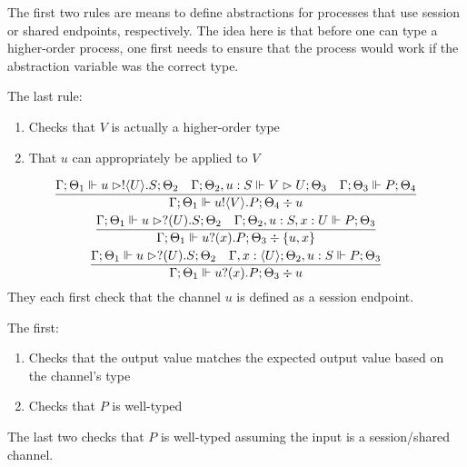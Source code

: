 The first two rules are means to define abstractions for processes that use session or shared endpoints, respectively. The idea here is that before one can type a higher-order process, one first needs to ensure that the process would work if the abstraction variable was the correct type.

The last rule:
\begin{enumerate}
    \item Checks that $V$ is actually a higher-order type
    \item That $u$ can appropriately be applied to $V$
\end{enumerate}

\begin{gather*}
\frac{\Gamma ; \Theta_1 \Vdash u \vartriangleright !\langle U \rangle . S ; \Theta_2 \quad \Gamma ; \Theta_2 , u : S \Vdash V \vartriangleright U ; \Theta_3 \quad \Gamma ; \Theta_3 \Vdash P ; \Theta_4}{\Gamma ; \Theta_1 \Vdash u ! \langle V \rangle . P ; \Theta_4 \div u} \\
\frac{\Gamma ;\Theta_1 \Vdash u \vartriangleright ?(U).S ; \Theta_2 \quad \Gamma ; \Theta_2 , u : S , x : U \Vdash P ; \Theta_3}{\Gamma ; \Theta_1 \Vdash u ? (x) . P ; \Theta_3 \div \{u,x\}} \\
\frac{\Gamma ; \Theta_1 \Vdash u \vartriangleright ?(U) . S ; \Theta_2 \quad \Gamma, x : \langle U \rangle ; \Theta_2 , u : S \Vdash P ; \Theta_3}{\Gamma ; \Theta_1 \Vdash u? (x) . P ; \Theta_3 \div u}
\end{gather*}
They each first check that the channel $u$ is defined as a session endpoint.

The first:
\begin{enumerate}
\item Checks that the output value matches the expected output value based on the channel's type
\item Checks that $P$ is well-typed
\end{enumerate}

The last two checks that $P$ is well-typed assuming the input is a session/shared channel.


